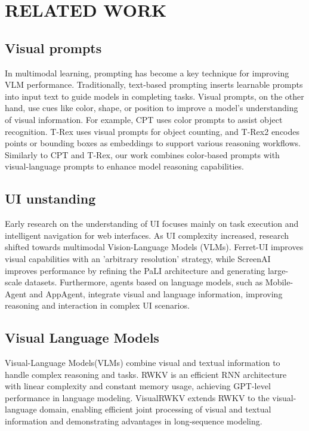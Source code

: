 \section{RELATED WORK}
\subsection{Visual prompts}
In multimodal learning, prompting has become a key technique for improving VLM performance. Traditionally, text-based prompting\cite{Texts}\cite{Prompting}\cite{Conditional-Prompt} inserts learnable prompts into input text to guide models in completing tasks. Visual prompts, on the other hand, use cues like color, shape, or position to improve a model's understanding of visual information. For example, CPT\cite{CPT}  uses color prompts to assist object recognition. T-Rex\cite{T-Rex} uses visual prompts for object counting, and T-Rex2\cite{T-Rex2} encodes points or bounding boxes as embeddings to support various reasoning workflows. Similarly to CPT and T-Rex,  our work combines color-based prompts with visual-language prompts to enhance model reasoning capabilities.
\subsection{UI unstanding}
Early research on the understanding of UI focuses mainly on task execution and intelligent navigation for web interfaces\cite{Navigate-the-Web}\cite{Reinforcement-Learning}. As UI complexity increased, research shifted towards multimodal Vision-Language Models (VLMs). Ferret-UI\cite{Ferret-UI} improves visual capabilities with an 'arbitrary resolution' strategy, while ScreenAI improves performance by refining the PaLI architecture and generating large-scale datasets. Furthermore, agents based on language models, such as Mobile-Agent\cite{Mobile-Agent} and AppAgent\cite{AppAgent}, integrate visual and language information, improving reasoning and interaction in complex UI scenarios.
\subsection{Visual Language Models} 
Visual-Language Models(VLMs) combine visual and textual information to handle complex reasoning and tasks. RWKV\cite{RWKV} is an efficient RNN architecture with linear complexity and constant memory usage, achieving GPT-level performance in language modeling. VisualRWKV\cite{VisualRWKV} extends RWKV to the visual-language domain, enabling efficient joint processing of visual and textual information and demonstrating advantages in long-sequence modeling.